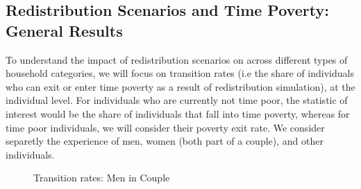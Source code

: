 \documentclass[
  11pt,
]{article}
\begin{document}
\subsection{Redistribution Scenarios and Time Poverty: General
Results}\label{redistribution-scenarios-and-time-poverty-general-results}

To understand the impact of redistribution scenarios on across different
types of household categories, we will focus on transition rates (i.e
the share of individuals who can exit or enter time poverty as a result
of redistribution simulation), at the individual level. For individuals
who are currently not time poor, the statistic of interest would be the
share of individuals that fall into time poverty, whereas for time poor
individuals, we will consider their poverty exit rate. We consider
separetly the experience of men, women (both part of a couple), and
other individuals.

\begin{figure}[H]


\caption{\label{fig-transition1}Transition rates: Men in Couple}

\end{figure}%
\end{document}
